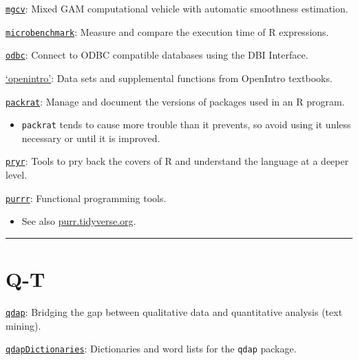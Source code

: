 \documentclass[]{book}
\providecommand{\tightlist}{%
  \setlength{\itemsep}{0pt}\setlength{\parskip}{0pt}}
\begin{document}
\href{https://CRAN.R-project.org/package=mgcv}{\texttt{mgcv}}: Mixed GAM computational vehicle with automatic smoothness estimation.

\href{https://CRAN.R-project.org/package=microbenchmark}{\texttt{microbenchmark}}: Measure and compare the execution time of R expressions.

\href{https://CRAN.R-project.org/package=odbc}{\texttt{odbc}}: Connect to ODBC compatible databases using the DBI Interface.

\href{https://CRAN.R-project.org/package=openintro}{`openintro'}: Data sets and supplemental functions from OpenIntro textbooks.

\href{https://CRAN.R-project.org/package=packrat}{\texttt{packrat}}: Manage and document the versions of packages used in an R program.

\begin{itemize}
\tightlist
\item
  \texttt{packrat} tends to cause more trouble than it prevents, so avoid using it unless necessary or until it is improved.
\end{itemize}

\href{https://CRAN.R-project.org/package=pryr}{\texttt{pryr}}: Tools to pry back the covers of R and understand the language at a deeper level.

\href{https://CRAN.R-project.org/package=purrr}{\texttt{purrr}}: Functional programming tools.

\begin{itemize}
\tightlist
\item
  See also \href{https://purrr.tidyverse.org/}{purr.tidyverse.org}.
\end{itemize}

\begin{center}\rule{0.5\linewidth}{\linethickness}\end{center}

\hypertarget{q-t}{%
\section{Q-T}\label{q-t}}

\href{https://CRAN.R-project.org/package=qdap}{\texttt{qdap}}: Bridging the gap between qualitative data and quantitative analysis (text mining).

\href{https://CRAN.R-project.org/package=qdapDictionaries}{\texttt{qdapDictionaries}}: Dictionaries and word lists for the \texttt{qdap} package.
\end{document}
